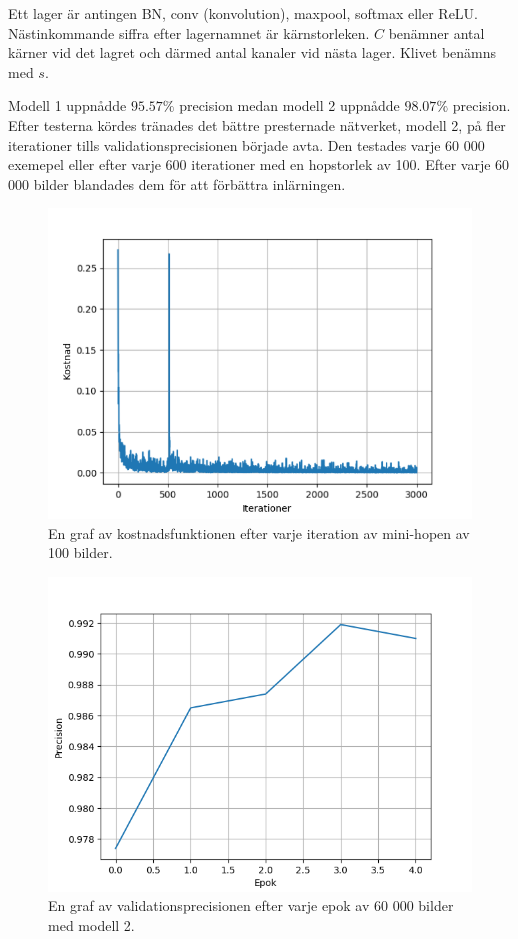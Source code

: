 \documentclass[a4paper,11pt,twoside]{article}
\begin{document}
Ett lager är antingen BN, conv (konvolution), maxpool, softmax eller ReLU. Nästinkommande siffra efter lagernamnet är kärnstorleken. $C$ benämner antal kärner vid det lagret och därmed antal kanaler vid nästa lager. Klivet benämns med $s$.

Modell 1 uppnådde $95.57\%$ precision medan modell 2 uppnådde $98.07\%$ precision. Efter testerna kördes tränades det bättre presternade nätverket, modell 2, på fler iterationer tills validationsprecisionen började avta. Den testades varje 60 000 exemepel eller efter varje 600 iterationer med en hopstorlek av 100. Efter varje 60 000 bilder blandades dem för att förbättra inlärningen.

\begin{figure}[h]\label{figkosnadmnist}
	\centering
  		\includegraphics[scale=0.6]{kostandsplot.png}
  	\caption{En graf av kostnadsfunktionen efter varje iteration av mini-hopen av 100 bilder.}
\end{figure}
\begin{figure}[h]\label{figepokmnist}
	\centering
  		\includegraphics[scale=0.6]{epokplot.png}
  	\caption{En graf av validationsprecisionen efter varje epok av 60 000 bilder med modell 2.}
\end{figure}
\end{document}
